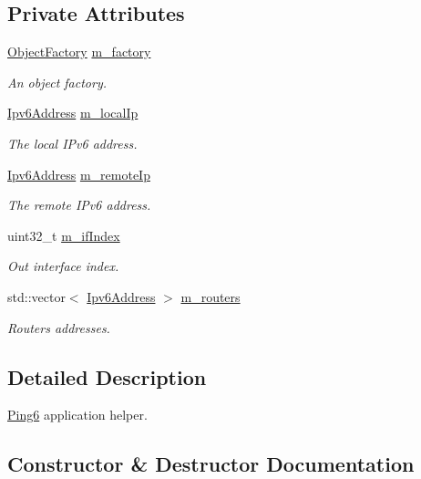 \subsection*{Private Attributes}
\begin{DoxyCompactItemize}
\item 
\hyperlink{classns3_1_1ObjectFactory}{Object\+Factory} \hyperlink{classns3_1_1Ping6Helper_a3b646aa614e4d1d5c525b3ab300f5b65}{m\+\_\+factory}
\begin{DoxyCompactList}\small\item\em An object factory. \end{DoxyCompactList}\item 
\hyperlink{classns3_1_1Ipv6Address}{Ipv6\+Address} \hyperlink{classns3_1_1Ping6Helper_adbda992481a64d242625bd20562b3fc2}{m\+\_\+local\+Ip}
\begin{DoxyCompactList}\small\item\em The local I\+Pv6 address. \end{DoxyCompactList}\item 
\hyperlink{classns3_1_1Ipv6Address}{Ipv6\+Address} \hyperlink{classns3_1_1Ping6Helper_ad231aed3d99835eaaaf70f72c016af07}{m\+\_\+remote\+Ip}
\begin{DoxyCompactList}\small\item\em The remote I\+Pv6 address. \end{DoxyCompactList}\item 
uint32\+\_\+t \hyperlink{classns3_1_1Ping6Helper_a5d2b7de4c57de609bbdb8ba2dcb2254d}{m\+\_\+if\+Index}
\begin{DoxyCompactList}\small\item\em Out interface index. \end{DoxyCompactList}\item 
std\+::vector$<$ \hyperlink{classns3_1_1Ipv6Address}{Ipv6\+Address} $>$ \hyperlink{classns3_1_1Ping6Helper_a734952847b4f6330fb41113cbfc9c633}{m\+\_\+routers}
\begin{DoxyCompactList}\small\item\em Routers addresses. \end{DoxyCompactList}\end{DoxyCompactItemize}


\subsection{Detailed Description}
\hyperlink{classns3_1_1Ping6}{Ping6} application helper. 

\subsection{Constructor \& Destructor Documentation}
